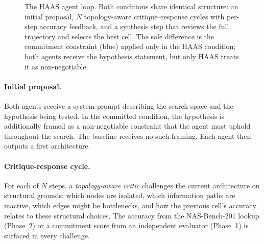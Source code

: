 \documentclass[10pt]{article}
\newcommand{\haas}{\textsc{HAAS}}
\begin{document}
\begin{figure}[ht]
\begin{center}
{}
\end{center}
\caption{The \haas{} agent loop. Both conditions share identical structure:
         an initial proposal, $N$ topology-aware critique--response cycles with
         per-step accuracy feedback, and a synthesis step that reviews the full
         trajectory and selects the best cell. The sole difference is the
         commitment constraint (blue) applied only in the \haas{} condition;
         both agents receive the hypothesis statement, but only \haas{} treats
         it as non-negotiable.}
\label{fig:loop}
\end{figure}

\paragraph{Initial proposal.} Both agents receive a system prompt describing
the search space and the hypothesis being tested. In the committed condition,
the hypothesis is additionally framed as a non-negotiable constraint that the
agent must uphold throughout the search. The baseline receives no such framing.
Each agent then outputs a first architecture.

\paragraph{Critique-response cycle.} For each of $N$ steps, a
\emph{topology-aware critic} challenges the current architecture on structural
grounds: which nodes are isolated, which information paths are inactive, which
edges might be bottlenecks, and how the previous cell's accuracy relates to these
structural choices. The accuracy from the NAS-Bench-201 lookup (Phase~2) or a
commitment score from an independent evaluator (Phase~1) is surfaced in every
challenge.
\end{document}
